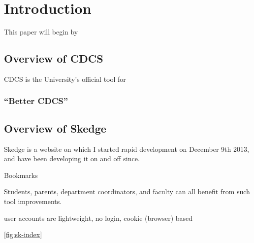 
\chapter{Introduction}

This paper will begin by 

\section{Overview of CDCS}

CDCS is the University's official tool for 

\label{fig:cdcs-index}

\subsection{``Better CDCS''}


\section{Overview of Skedge}

Skedge is a website on which I started rapid development on December 9th 2013, and have been developing it on and off since.

Bookmarks

Students, parents, department coordinators, and faculty can all benefit from such tool improvements.

user accounts are lightweight, no login, cookie (browser) based

\ref{fig:sk-index}



